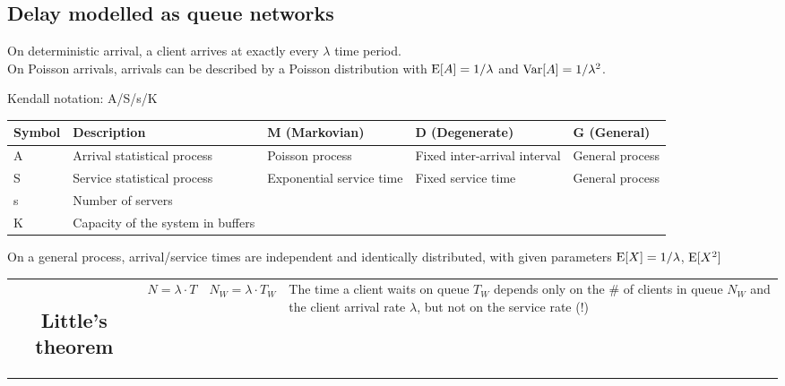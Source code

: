 \documentclass{form}
\begin{document}
\subsection*{Delay modelled as queue networks}

On deterministic arrival, a client arrives at exactly every $\lambda$ time period.\\
On Poisson arrivals, arrivals can be described by a Poisson distribution with $\operatorname{E}[A]=1/\lambda$ and $\operatorname{Var}[A]=1/\lambda^2$.

Kendall notation: A/S/s/K
\begin{center}
    \begin{tabular}{l | l | l | l | l}
        \textbf{Symbol} & \textbf{Description}              & \textbf{M (Markovian)}   & \textbf{D (Degenerate)}      & \textbf{G (General)} \\ \hline
        A               & Arrival statistical process       & Poisson process          & Fixed inter-arrival interval & General process      \\
        S               & Service statistical process       & Exponential service time & Fixed service time           & General process      \\
        s               & Number of servers                 &                          &                              &                      \\
        K               & Capacity of the system in buffers &                          &                              &                     
    \end{tabular}
\end{center}
On a general process, arrival/service times are independent and identically distributed, with given parameters $\operatorname{E}[X]=1/\lambda$, $\operatorname{E}[X^2]$ 

\begin{center}
    \begin{tabular}{c c c p{110mm}}
        \begin{minipage}{0.17\textwidth}\subsection*{Little's theorem}\end{minipage} &
        $N = \lambda \cdot T$ &
        $N_W = \lambda \cdot T_W$ &
        The time a client waits on queue $T_W$ depends only on the \# of clients in queue $N_W$ and the client arrival rate $\lambda$, but not on the service rate (!)
    \end{tabular}
\end{center}
\end{document}
